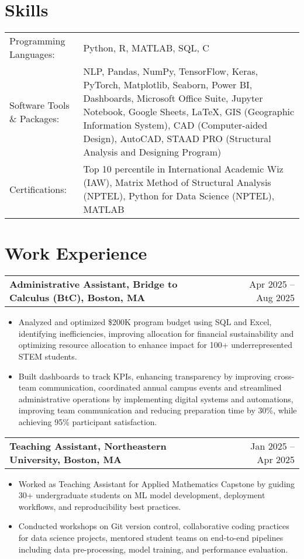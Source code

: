 \documentclass[a4paper,10pt]{article}
\makeatletter
\newenvironment{joblong}[2]
    {
    \begin{tabularx}{\linewidth}{@{}l X r@{}}
    \textbf{#1} & \hfill &  #2 \\[2pt]
    \end{tabularx}
    \begin{minipage}[t]{\linewidth}
    \begin{itemize}[nosep,leftmargin=1em, itemsep=2pt,label=--]
    }
    {
    \end{itemize}
    \end{minipage}    
    }
\makeatother
\begin{document}
\section{Skills}
\begin{tabularx}{\linewidth}{@{}l X@{}}
Programming Languages: & Python, R, MATLAB, SQL, C \\
Software Tools \& Packages: & NLP, Pandas, NumPy, TensorFlow, Keras, PyTorch, Matplotlib, Seaborn, Power BI,  Dashboards, Microsoft Office Suite, Jupyter Notebook, Google Sheets, LaTeX, GIS (Geographic Information System), CAD (Computer-aided Design), AutoCAD, STAAD PRO (Structural Analysis and Designing Program) \\
Certifications: & Top 10 percentile in International Academic Wiz (IAW), Matrix Method
of Structural Analysis (NPTEL), Python for Data Science (NPTEL),
MATLAB \\
\end{tabularx}


\section{Work Experience}

\begin{joblong}{Administrative Assistant, Bridge to Calculus (BtC), Boston, MA}{Apr 2025 -- Aug 2025}
\item Analyzed and optimized \$200K program budget using SQL and Excel, identifying inefficiencies, improving allocation for financial sustainability and optimizing
resource allocation to enhance impact for 100+ underrepresented STEM students.
\item Built dashboards to track KPIs, enhancing transparency by improving cross-team communication, coordinated annual campus events and streamlined administrative operations by implementing digital systems and automations, improving team communication and reducing preparation time by 30\%, while achieving 95\% participant satisfaction.  
\end{joblong}

\begin{joblong}{Teaching Assistant, Northeastern University, Boston, MA}{Jan 2025 -- Apr 2025}
\item Worked as Teaching Assistant for Applied Mathematics Capstone by guiding 30+ undergraduate students on ML model development, deployment workflows, and reproducibility best practices.
\item Conducted workshops on Git version control, collaborative coding practices for data science projects, mentored student teams on end-to-end pipelines including data pre-processing, model training, and performance evaluation.
\end{joblong}
\end{document}
